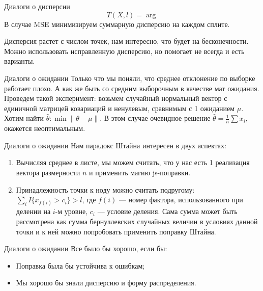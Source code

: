 \documentclass[14pt, fleqn, xcolor={dvipsnames, table}]{beamer}
\begin{document}
\begin{frame}{Диалоги о дисперсии}
$$
T(X, l) = \arg 
$$
В случае MSE минимизируем суммарную дисперсию на каждом сплите.

Дисперсия растет с числом точек, нам интересно, что будет на бесконечности. Можно использовать исправленную дисперсию, но помогает не всегда и есть варианты.

\end{frame}
\begin{frame}{Диалоги о ожидании} %
Только что мы поняли, что среднее отклонение по выборке работает плохо. А как же быть со средним выборочным в качестве мат ожидания. \\
Проведем такой эксперимент: возьмем случайный нормальный вектор с единичной матрицей ковариаций и ненулевым, сравнимым с 1 ожиданием $\mu$. Хотим найти $\hat{\theta}: \min \|\theta - \mu\|$. В этом случае очевидное решение $\hat{\theta} = \frac{1}{n}\sum x_i$, окажется неоптимальным. %
\end{frame}

\begin{frame}{Диалоги о ожидании} %
Нам парадокс Штайна интересен в двух аспектах:
\begin{enumerate}
  \item Вычисляя среднее в листе, мы можем считать, что у нас есть 1 реализация вектора размерности $n$ и применить магию js-поправки.
  \item Принадлежность точки к ноду можно считать подругому: $\sum_i I\{x_{f(i)} > c_i\} > l$, где $f(i)$ --- номер фактора, использованного при делении на $i$-м уровне, $c_i$ --- условие деления. Сама сумма может быть рассмотрена как сумма бернуллевских случайных величин в условиях данной точки и к ней можно попробовать применить поправку Штайна.
\end{enumerate}
\end{frame}

\begin{frame}{Диалоги о ожидании} %
Все было бы хорошо, если бы:
\begin{itemize}
  \item Поправка была бы устойчива к ошибкам; %
  \item Мы хорошо бы знали дисперсию и форму распределения.
\end{itemize}
\end{frame}


\end{document}
